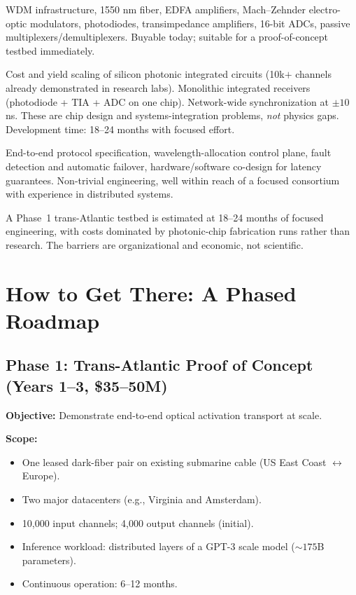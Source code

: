 \documentclass[12pt]{article}
\begin{document}
\begin{description}[leftmargin=1.6em,itemsep=3pt]
  \item[Tier 1 \textemdash{} Off-the-shelf.] WDM infrastructure, 1550 nm fiber,
  EDFA amplifiers, Mach--Zehnder electro-optic modulators, photodiodes,
  transimpedance amplifiers, 16-bit ADCs, passive multiplexers/demultiplexers.
  Buyable today; suitable for a proof-of-concept testbed immediately.
  
  \item[Tier 2 \textemdash{} Emerging, needs optimization.] Cost and yield scaling of
  silicon photonic integrated circuits (10k$+$ channels already demonstrated in
  research labs). Monolithic integrated receivers (photodiode + TIA + ADC on one
  chip). Network-wide synchronization at \(\pm\!10\) ns. These are chip design
  and systems-integration problems, \emph{not} physics gaps. Development time:
  18--24 months with focused effort.
  
  \item[Tier 3 \textemdash{} Systems integration.] End-to-end protocol specification,
  wavelength-allocation control plane, fault detection and automatic failover,
  hardware/software co-design for latency guarantees. Non-trivial engineering,
  well within reach of a focused consortium with experience in distributed systems.
\end{description}

\noindent A Phase~1 trans-Atlantic testbed is estimated at 18--24 months of focused
engineering, with costs dominated by photonic-chip fabrication runs rather than
research. The barriers are organizational and economic, not scientific.

\section{How to Get There: A Phased Roadmap}
\label{sec:roadmap}

\subsection{Phase 1: Trans-Atlantic Proof of Concept (Years 1--3, \$35--50M)}

\textbf{Objective:} Demonstrate end-to-end optical activation transport at scale.

\textbf{Scope:}
\begin{itemize}[leftmargin=1.6em,itemsep=2pt]
  \item One leased dark-fiber pair on existing submarine cable (US East Coast
  $\leftrightarrow$ Europe).
  \item Two major datacenters (e.g., Virginia and Amsterdam).
  \item 10,000 input channels; 4,000 output channels (initial).
  \item Inference workload: distributed layers of a GPT-3 scale model
  (\(\sim\!175\)B parameters).
  \item Continuous operation: 6--12 months.
\end{itemize}
\end{document}
